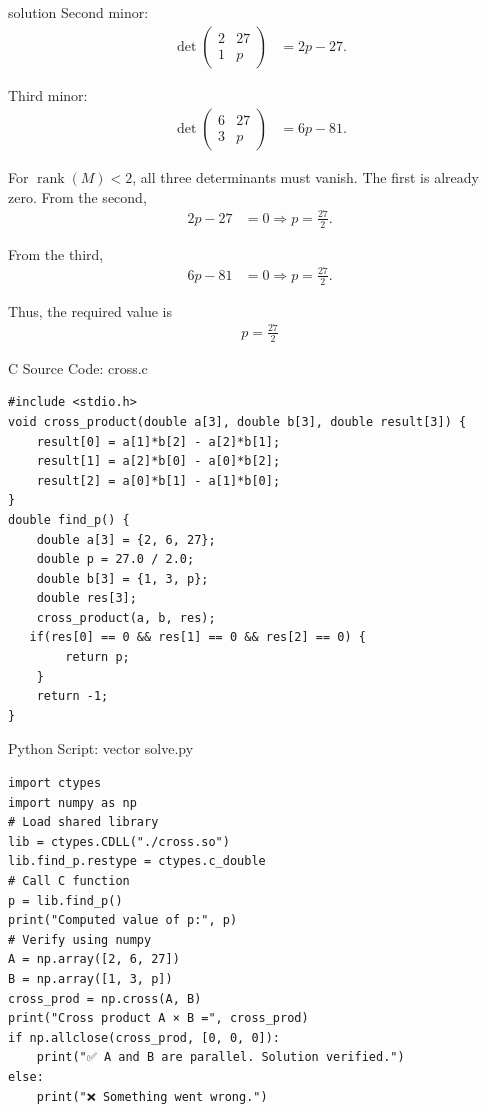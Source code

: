\documentclass{beamer}
\numberwithin{equation}{section}
\theoremstyle{remark}
\newcommand{\myvec}[1]{\ensuremath{\begin{pmatrix}#1\end{pmatrix}}}
\begin{document}
\begin{frame}{solution}
Second minor:
\begin{align}
\det\myvec{2 & 27 \\ 1 & p} &= 2p - 27.
\end{align}

Third minor:
\begin{align}
\det\myvec{6 & 27 \\ 3 & p} &= 6p - 81.
\end{align}

For $\operatorname{rank}(M)<2$, all three determinants must vanish. 
The first is already zero. From the second,
\begin{align}
2p - 27 &= 0  \Rightarrow  p = \tfrac{27}{2}.
\end{align}

From the third,
\begin{align}
6p - 81 &= 0  \Rightarrow  p = \tfrac{27}{2}.
\end{align}

Thus, the required value is
\begin{align}
\boxed{p = \tfrac{27}{2}}
\end{align}



\end{frame}

\begin{frame}[fragile]{C Source Code: cross.c}
\begin{verbatim}
#include <stdio.h>
void cross_product(double a[3], double b[3], double result[3]) {
    result[0] = a[1]*b[2] - a[2]*b[1];
    result[1] = a[2]*b[0] - a[0]*b[2];
    result[2] = a[0]*b[1] - a[1]*b[0];
}
double find_p() {
    double a[3] = {2, 6, 27};
    double p = 27.0 / 2.0;
    double b[3] = {1, 3, p};
    double res[3];
    cross_product(a, b, res);
   if(res[0] == 0 && res[1] == 0 && res[2] == 0) {
        return p;
    }
    return -1;
}

\end{verbatim}
\end{frame}

\begin{frame}[fragile]{Python Script: vector solve.py}
\begin{verbatim}
import ctypes
import numpy as np
# Load shared library
lib = ctypes.CDLL("./cross.so")
lib.find_p.restype = ctypes.c_double
# Call C function
p = lib.find_p()
print("Computed value of p:", p)
# Verify using numpy
A = np.array([2, 6, 27])
B = np.array([1, 3, p])
cross_prod = np.cross(A, B)
print("Cross product A × B =", cross_prod)
if np.allclose(cross_prod, [0, 0, 0]):
    print("✅ A and B are parallel. Solution verified.")
else:
    print("❌ Something went wrong.")
\end{verbatim}
\end{frame}
\end{document}
